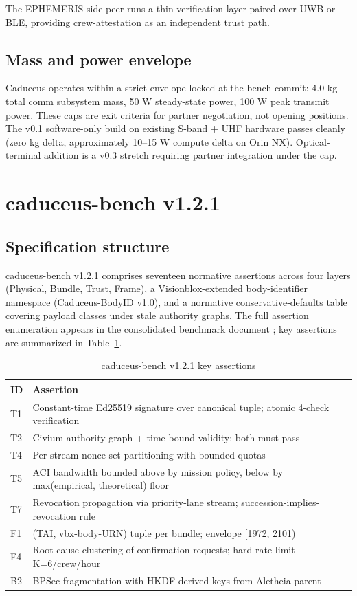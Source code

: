 \documentclass[conference]{IEEEtran}
\begin{document}
The EPHEMERIS-side peer runs a thin verification layer paired over UWB or BLE, providing crew-attestation as an independent trust path.

\subsection{Mass and power envelope}

Caduceus operates within a strict envelope locked at the bench commit: 4.0 kg total comm subsystem mass, 50 W steady-state power, 100 W peak transmit power. These caps are exit criteria for partner negotiation, not opening positions. The v0.1 software-only build on existing S-band + UHF hardware passes cleanly (zero kg delta, approximately 10--15 W compute delta on Orin NX). Optical-terminal addition is a v0.3 stretch requiring partner integration under the cap.

\section{caduceus-bench v1.2.1}\label{sec:bench}

\subsection{Specification structure}

caduceus-bench v1.2.1 comprises seventeen normative assertions across four layers (Physical, Bundle, Trust, Frame), a Visionblox-extended body-identifier namespace (Caduceus-BodyID v1.0), and a normative conservative-defaults table covering payload classes under stale authority graphs. The full assertion enumeration appears in the consolidated benchmark document \cite{caduceus2026bench}; key assertions are summarized in Table~\ref{tab:bench}.

\begin{table}[h]
\caption{caduceus-bench v1.2.1 key assertions}
\label{tab:bench}
\centering
\small
\begin{tabular}{p{0.7cm}p{6.0cm}}
\toprule
\textbf{ID} & \textbf{Assertion} \\
\midrule
T1 & Constant-time Ed25519 signature over canonical tuple; atomic 4-check verification \\
T2 & Civium authority graph + time-bound validity; both must pass \\
T4 & Per-stream nonce-set partitioning with bounded quotas \\
T5 & ACI bandwidth bounded above by mission policy, below by max(empirical, theoretical) floor \\
T7 & Revocation propagation via priority-lane stream; succession-implies-revocation rule \\
F1 & (TAI, vbx-body-URN) tuple per bundle; envelope [1972, 2101) \\
F4 & Root-cause clustering of confirmation requests; hard rate limit K=6/crew/hour \\
B2 & BPSec fragmentation with HKDF-derived keys from Aletheia parent \\
\bottomrule
\end{tabular}
\end{table}
\end{document}
